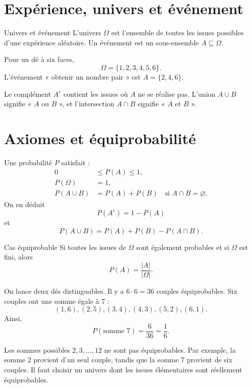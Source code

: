 \documentclass[12pt,a4paper,openany]{book}
\newcommand{\abs}[1]{\left\lvert #1\right\rvert}
\begin{document}
\section{Expérience, univers et événement}

\begin{definition}{Univers et événement}{}
L'univers $\Omega$ est l'ensemble de toutes les issues possibles d'une expérience aléatoire. Un événement est un sous-ensemble $A\subseteq\Omega$.
\end{definition}

Pour un dé à six faces,
\[
\Omega=\{1,2,3,4,5,6\}.
\]
L'événement « obtenir un nombre pair » est $A=\{2,4,6\}$.

Le complément $A^c$ contient les issues où $A$ ne se réalise pas. L'union $A\cup B$ signifie « $A$ ou $B$ », et l'intersection $A\cap B$ signifie « $A$ et $B$ ».

\section{Axiomes et équiprobabilité}

Une probabilité $P$ satisfait :
\begin{align*}
0&\le P(A)\le1,\\
P(\Omega)&=1,\\
P(A\cup B)&=P(A)+P(B)\quad\text{si }A\cap B=\varnothing.
\end{align*}
On en déduit
\[
P(A^c)=1-P(A)
\]
et
\[
P(A\cup B)=P(A)+P(B)-P(A\cap B).
\]

\begin{theorem}{Cas équiprobable}{}
Si toutes les issues de $\Omega$ sont également probables et si $\Omega$ est fini, alors
\[
P(A)=\frac{\abs A}{\abs\Omega}.
\]
\end{theorem}

\begin{examplebox}
On lance deux dés distinguables. Il y a $6\cdot6=36$ couples équiprobables. Six couples ont une somme égale à $7$ :
\[
(1,6),(2,5),(3,4),(4,3),(5,2),(6,1).
\]
Ainsi,
\[
P(\text{somme }7)=\frac6{36}=\frac16.
\]
\end{examplebox}

\begin{warningbox}
Les sommes possibles $2,3,\ldots,12$ ne sont pas équiprobables. Par exemple, la somme $2$ provient d'un seul couple, tandis que la somme $7$ provient de six couples. Il faut choisir un univers dont les issues élémentaires sont réellement équiprobables.
\end{warningbox}
\end{document}
